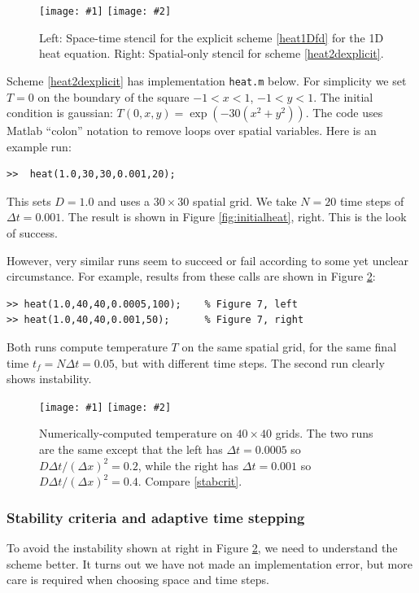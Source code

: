 \documentclass[letterpaper,final,12pt,reqno]{amsart}
\newcommand{\minput}[1]{
\vspace{0.8cm}
\VerbatimInput[frame=single,framesep=3mm,label=\fbox{\normalsize \textsl{\,#1.m\,}},fontfamily=courier,fontsize=\footnotesize]{../mfiles/#1.slim.m}
\vspace{0.5cm}
}
\newcommand{\twofigsizes}[5]{
\begin{figure}[ht]
\centering
\texttt{[image: \#1]} \quad
\texttt{[image: \#2]}
\caption{#3}
\label{fig:#1}
\end{figure}}
\newcommand{\twofig}[3]{\twofigsizes{#1}{#2}{#3}{2.5in}{2.5in}}
\begin{document}
\twofigsizes{expstencil}{exp2dstencil}{Left: Space-time stencil for the explicit scheme \eqref{heat1Dfd} for the 1D heat equation.  Right: Spatial-only stencil for scheme \eqref{heat2dexplicit}.}{2.0in}{2.1in}

Scheme \eqref{heat2dexplicit} has implementation \texttt{heat.m} below.  For simplicity we set $T=0$ on the boundary of the square $-1 < x < 1$, $-1 < y < 1$.  The initial condition is gaussian: $T(0,x,y) = \exp(-30 (x^2+y^2))$.  The code uses Matlab ``colon'' notation to remove loops over spatial variables.  Here is an example run:
\begin{Verbatim}
>>  heat(1.0,30,30,0.001,20);
\end{Verbatim}
This sets $D=1.0$ and uses a $30\times 30$ spatial grid.  We take $N=20$ time steps of $\Delta t = 0.001$.  The result is shown in Figure \ref{fig:initialheat}, right.  This is the look of success.

\minput{heat}

However, very similar runs seem to succeed or fail according to some yet unclear circumstance.  For example, results from these calls are shown in Figure \ref{fig:stability}:
\begin{Verbatim}
>> heat(1.0,40,40,0.0005,100);    % Figure 7, left
>> heat(1.0,40,40,0.001,50);      % Figure 7, right
\end{Verbatim}
Both runs compute temperature $T$ on the same spatial grid, for the same final time $t_f = N \Delta t = 0.05$, but with different time steps.  The second run clearly shows instability.

\twofig{stability}{instability}{Numerically-computed temperature on $40\times 40$ grids.  The two runs are the same except that the left has $\Delta t=0.0005$ so $D\Delta t/(\Delta x)^2= 0.2$, while the right has $\Delta t=0.001$ so $D\Delta t/(\Delta x)^2= 0.4$.  Compare \eqref{stabcrit}.}


\subsubsection*{Stability criteria and adaptive time stepping}  To avoid the instability shown at right in Figure \ref{fig:stability}, we need to understand the scheme better.  It turns out we have not made an implementation error, but more care is required when choosing space and time steps.
\end{document}
